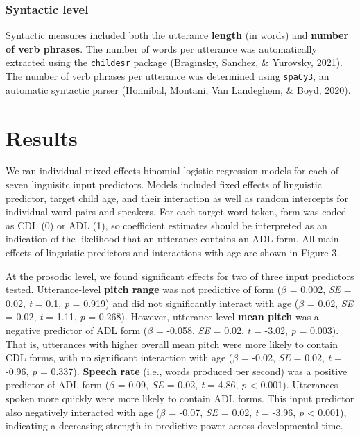 \documentclass[10pt, letterpaper]{article}
\begin{document}
\hypertarget{syntactic-level}{%
\subsubsection{Syntactic level}\label{syntactic-level}}

Syntactic measures included both the utterance \textbf{length} (in
words) and \textbf{number of verb phrases}. The number of words per
utterance was automatically extracted using the \texttt{childesr}
package (Braginsky, Sanchez, \& Yurovsky, 2021). The number of verb
phrases per utterance was determined using \texttt{spaCy3}, an automatic
syntactic parser (Honnibal, Montani, Van Landeghem, \& Boyd, 2020).

\hypertarget{results-1}{%
\section{Results}\label{results-1}}

We ran individual mixed-effects binomial logistic regression models for
each of seven linguisitc input predictors. Models included fixed effects
of linguistic predictor, target child age, and their interaction as well
as random intercepts for individual word pairs and speakers. For each
target word token, form was coded as CDL (0) or ADL (1), so coefficient
estimates should be interpreted as an indication of the likelihood that
an utterance contains an ADL form. All main effects of linguistic
predictors and interactions with age are shown in Figure 3.

At the prosodic level, we found significant effects for two of three
input predictors tested. Utterance-level \textbf{pitch range} was not
predictive of form (\(\beta\) = 0.002, \emph{SE} = 0.02, \emph{t} = 0.1,
\emph{p} = 0.919) and did not significantly interact with age (\(\beta\)
= 0.02, \emph{SE} = 0.02, \emph{t} = 1.11, \emph{p} = 0.268). However,
utterance-level \textbf{mean pitch} was a negative predictor of ADL form
(\(\beta\) = -0.058, \emph{SE} = 0.02, \emph{t} = -3.02, \emph{p} =
0.003). That is, utterances with higher overall mean pitch were more
likely to contain CDL forms, with no significant interaction with age
(\(\beta\) = -0.02, \emph{SE} = 0.02, \emph{t} = -0.96, \emph{p} =
0.337). \textbf{Speech rate} (i.e., words produced per second) was a
positive predictor of ADL form (\(\beta\) = 0.09, \emph{SE} = 0.02,
\emph{t} = 4.86, \emph{p} \textless{} 0.001). Utterances spoken more
quickly were more likely to contain ADL forms. This input predictor also
negatively interacted with age (\(\beta\) = -0.07, \emph{SE} = 0.02,
\emph{t} = -3.96, \emph{p} \textless{} 0.001), indicating a decreasing
strength in predictive power across developmental time.
\end{document}
